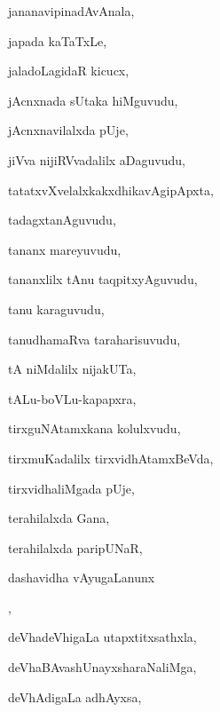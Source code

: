\begin{multicols}{3}
{\noindent
{jananavipinadAvAnala}, \pageref{jananavipinadAvAnala}

\noindent
{japada kaTaTxLe}, \pageref{japada kaTaTxLe}

\noindent
{jaladoLagidaR kicucx}, \pageref{jaladoLagidaR kicucx}

\noindent
{jAcnxnada sUtaka hiMguvudu}, \pageref{jAcnxnada sUtaka hiMguvudu}

\noindent
{jAcnxnavilalxda pUje}, \pageref{jAcnxnavilalxda pUje}

\noindent
{jiVva nijiRVvadalilx aDaguvudu}, \pageref{jiVva nijiRVvadalilx aDaguvudu}

\noindent
{tatatxvXvelalxkakxdhikavAgipApxta}, \pageref{tatatxvXvelalxkakxdhikavAgipApxta}

\noindent
{tadagxtanAguvudu}, \pageref{tadagxtanAguvudu}

\noindent
{tananx mareyuvudu}, \pageref{tananx mareyuvudu}

\noindent
{tananxlilx tAnu taqpitxyAguvudu}, \pageref{tananxlilx tAnu taqpitxyAguvudu}

\noindent
{tanu karaguvudu}, \pageref{tanu karaguvudu}

\noindent
{tanudhamaRva taraharisuvudu}, \pageref{tanudhamaRva taraharisuvudu}

\noindent
{tA niMdalilx nijakUTa}, \pageref{tA niMdalilx nijakUTa}

\noindent
{tALu-boVLu-kapapxra}, \pageref{tALu-boVLu-kapapxra}

\noindent
{tirxguNAtamxkana kolulxvudu}, \pageref{tirxguNAtamxkana kolulxvudu}

\noindent
{tirxmuKadalilx tirxvidhAtamxBeVda}, \pageref{tirxmuKadalilx tirxvidhAtamxBeVda}

\noindent
{tirxvidhaliMgada pUje}, \pageref{tirxvidhaliMgada pUje}

\noindent
{terahilalxda Gana}, \pageref{terahilalxda Gana}

\noindent
{terahilalxda paripUNaR}, \pageref{terahilalxda paripUNaR}

\noindent
{dashavidha vAyugaLanunx}

\noindent
{}, \pageref{dashavidha vAyugaLanunx nililxsuvudu}

\noindent
{deVhadeVhigaLa utapxtitxsathxla}, \pageref{deVhadeVhigaLa utapxtitxsathxla}

\noindent
{deVhaBAvashUnayxsharaNaliMga}, \pageref{deVhaBAvashUnayxsharaNaliMga}

\noindent
{deVhAdigaLa adhAyxsa}, \pageref{deVhAdigaLa adhAyxsa}

}
\end{multicols}
